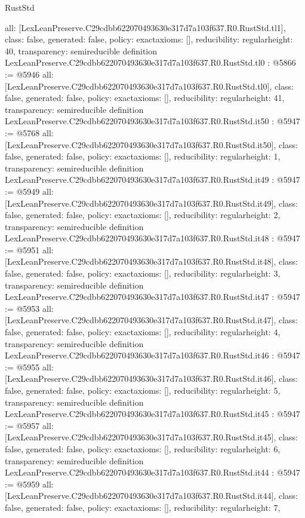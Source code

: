 \begin{lexlean}{RustStd}
\begin{coremodule}
{  all: [LexLeanPreserve.C29cdbb622070493630e317d7a103f637.R0.RustStd.tl1],
  class: false,
  generated: false,
  policy: exact{axioms: []},
  reducibility: regular{height: 40},
  transparency: semireducible
}
definition LexLeanPreserve.C29cdbb622070493630e317d7a103f637.R0.RustStd.tl0 : @5866 := @5946 {
  all: [LexLeanPreserve.C29cdbb622070493630e317d7a103f637.R0.RustStd.tl0],
  class: false,
  generated: false,
  policy: exact{axioms: []},
  reducibility: regular{height: 41},
  transparency: semireducible
}
definition LexLeanPreserve.C29cdbb622070493630e317d7a103f637.R0.RustStd.it50 : @5947 := @5768 {
  all: [LexLeanPreserve.C29cdbb622070493630e317d7a103f637.R0.RustStd.it50],
  class: false,
  generated: false,
  policy: exact{axioms: []},
  reducibility: regular{height: 1},
  transparency: semireducible
}
definition LexLeanPreserve.C29cdbb622070493630e317d7a103f637.R0.RustStd.it49 : @5947 := @5949 {
  all: [LexLeanPreserve.C29cdbb622070493630e317d7a103f637.R0.RustStd.it49],
  class: false,
  generated: false,
  policy: exact{axioms: []},
  reducibility: regular{height: 2},
  transparency: semireducible
}
definition LexLeanPreserve.C29cdbb622070493630e317d7a103f637.R0.RustStd.it48 : @5947 := @5951 {
  all: [LexLeanPreserve.C29cdbb622070493630e317d7a103f637.R0.RustStd.it48],
  class: false,
  generated: false,
  policy: exact{axioms: []},
  reducibility: regular{height: 3},
  transparency: semireducible
}
definition LexLeanPreserve.C29cdbb622070493630e317d7a103f637.R0.RustStd.it47 : @5947 := @5953 {
  all: [LexLeanPreserve.C29cdbb622070493630e317d7a103f637.R0.RustStd.it47],
  class: false,
  generated: false,
  policy: exact{axioms: []},
  reducibility: regular{height: 4},
  transparency: semireducible
}
definition LexLeanPreserve.C29cdbb622070493630e317d7a103f637.R0.RustStd.it46 : @5947 := @5955 {
  all: [LexLeanPreserve.C29cdbb622070493630e317d7a103f637.R0.RustStd.it46],
  class: false,
  generated: false,
  policy: exact{axioms: []},
  reducibility: regular{height: 5},
  transparency: semireducible
}
definition LexLeanPreserve.C29cdbb622070493630e317d7a103f637.R0.RustStd.it45 : @5947 := @5957 {
  all: [LexLeanPreserve.C29cdbb622070493630e317d7a103f637.R0.RustStd.it45],
  class: false,
  generated: false,
  policy: exact{axioms: []},
  reducibility: regular{height: 6},
  transparency: semireducible
}
definition LexLeanPreserve.C29cdbb622070493630e317d7a103f637.R0.RustStd.it44 : @5947 := @5959 {
  all: [LexLeanPreserve.C29cdbb622070493630e317d7a103f637.R0.RustStd.it44],
  class: false,
  generated: false,
  policy: exact{axioms: []},
  reducibility: regular{height: 7},
}
\end{coremodule}
\end{lexlean}
